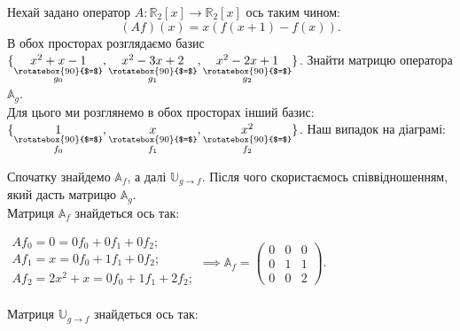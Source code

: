 \documentclass{math_library}
\begin{document}
\begin{example}
Нехай задано оператор $A \colon \mathbb{R}_2[x] \to \mathbb{R}_2[x]$ ось таким чином:
\[
(Af)(x) = x(f(x+1)-f(x)).
\]
В обох просторах розглядаємо базис $\{\underset{\substack{\rotatebox{90}{$=$} \\ g_0}}{x^2+x-1},\underset{\substack{\rotatebox{90}{$=$} \\ g_1}}{x^2-3x+2},\underset{\substack{\rotatebox{90}{$=$} \\ g_2}}{x^2-2x+1}\}$. Знайти матрицю оператора $\mathbb{A}_g$.\\
Для цього ми розглянемо в обох просторах інший базис: $\{\underset{\substack{\rotatebox{90}{$=$} \\ f_0}}{1},\underset{\substack{\rotatebox{90}{$=$} \\ f_1}}{x},\underset{\substack{\rotatebox{90}{$=$} \\ f_2}}{x^2}\}$. Наш випадок на діаграмі:
\begin{center}
\end{center}
Спочатку знайдемо $\mathbb{A}_f$, а далі $\mathbb{U}_{g \to f}$. Після чого скористаємось співвідношенням, який дасть матрицю $\mathbb{A}_g$.\\
Матриця $\mathbb{A}_f$ знайдеться ось так:
\begin{center}
$
\begin{gathered}
Af_0 = 0 = 0f_0 + 0f_1 + 0f_2;\\
Af_1 = x = 0f_0 + 1f_1 + 0f_2;\\
Af_2 = 2x^2+x = 0f_0+1f_1+2f_2;\\
\end{gathered} \implies \mathbb{A}_f = \begin{pmatrix}
0 & 0 & 0 \\
0 & 1 & 1 \\
0 & 0 & 2
\end{pmatrix}.
$
\end{center}
Матриця $\mathbb{U}_{g \to f}$ знайдеться ось так:
\begin{center}

\end{center}
\end{example}
\end{document}
